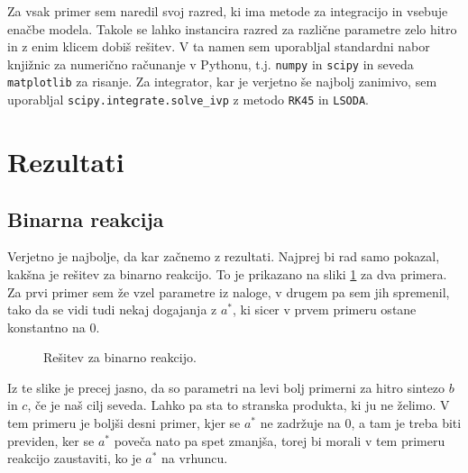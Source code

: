 \documentclass[a4paper]{article}
\begin{document}
Za vsak primer sem naredil svoj razred, ki ima metode za integracijo in vsebuje enačbe modela. Takole
se lahko instancira razred za različne parametre zelo hitro in z enim klicem dobiš rešitev. V ta namen sem
uporabljal standardni nabor knjižnic za numerično računanje v Pythonu, t.j. \texttt{numpy} in \texttt{scipy} in
seveda \texttt{matplotlib} za risanje. Za integrator, kar je verjetno še najbolj zanimivo, sem uporabljal
\texttt{scipy.integrate.solve\_ivp} z metodo \texttt{RK45} in \texttt{LSODA}. \\

\section{Rezultati}
\subsection{Binarna reakcija}
Verjetno je najbolje, da kar začnemo z rezultati. Najprej bi rad samo pokazal, kakšna je rešitev za
binarno reakcijo. To je prikazano na sliki \ref{fig:binarna} za dva primera. Za prvi primer sem že vzel
parametre iz naloge, v drugem pa sem jih spremenil, tako da se vidi tudi nekaj dogajanja z $a^*$, ki sicer
v prvem primeru ostane konstantno na $0$.\\

\begin{figure}[H]
    \centering
    \caption{Rešitev za binarno reakcijo.}
    \label{fig:binarna}
\end{figure}

Iz te slike je precej jasno, da so parametri na levi bolj primerni za hitro sintezo $b$ in $c$, če je
naš cilj seveda. Lahko pa sta to stranska produkta, ki ju ne želimo. V tem primeru je boljši desni primer,
kjer se $a^*$ ne zadržuje na $0$, a tam je treba biti previden, ker se $a^*$ poveča nato pa spet zmanjša, 
torej bi morali v tem primeru reakcijo zaustaviti, ko je $a^*$ na vrhuncu.\\
\end{document}
